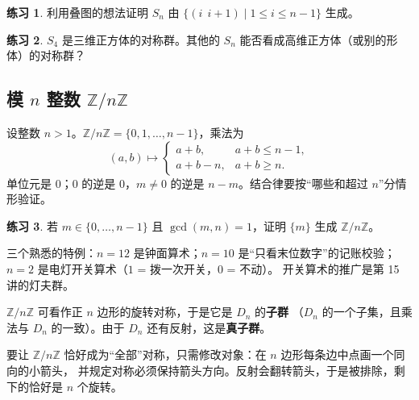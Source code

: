 \documentclass[11pt,a4paper]{article}
\theoremstyle{definition}
\newtheorem{exercise}{练习}
\theoremstyle{plain}
\theoremstyle{remark}
\newcommand{\Z}{\mathbb{Z}}
\begin{document}
\begin{exercise}
利用叠图的想法证明 $S_n$ 由 $\{(i\;\,i{+}1)\mid 1\le i\le n-1\}$ 生成。
\end{exercise}
\begin{exercise}
$S_4$ 是三维正方体的对称群。其他的 $S_n$ 能否看成高维正方体（或别的形体）的对称群？
\end{exercise}

\subsection{模 $n$ 整数 $\Z/n\Z$}

设整数 $n>1$。$\Z/n\Z=\{0,1,\dots,n-1\}$，乘法为
\[
  (a,b)\mapsto
  \begin{cases}
    a+b, & a+b\le n-1,\\
    a+b-n, & a+b\ge n.
  \end{cases}
\]
单位元是 $0$；$0$ 的逆是 $0$，$m\neq0$ 的逆是 $n-m$。结合律要按“哪些和超过 $n$”分情形验证。

\begin{exercise}
若 $m\in\{0,\dots,n-1\}$ 且 $\gcd(m,n)=1$，证明 $\{m\}$ 生成 $\Z/n\Z$。
\end{exercise}

三个熟悉的特例：$n=12$ 是钟面算术；$n=10$ 是“只看末位数字”的记账校验；$n=2$ 是电灯开关算术（$1$ = 拨一次开关，$0$ = 不动）。
开关算术的推广是第 15 讲的灯夫群。

\begin{keyidea}[$\Z/n\Z$ 是什么东西的对称群？]
$\Z/n\Z$ 可看作正 $n$ 边形的旋转对称，于是它是 $D_n$ 的\textbf{子群}
（$D_n$ 的一个子集，且乘法与 $D_n$ 的一致）。由于 $D_n$ 还有反射，这是\textbf{真子群}。

要让 $\Z/n\Z$ 恰好成为“全部”对称，只需修改对象：在 $n$ 边形每条边中点画一个同向的小箭头，
并规定对称必须保持箭头方向。反射会翻转箭头，于是被排除，剩下的恰好是 $n$ 个旋转。
\begin{center}
\end{center}
\end{keyidea}
\end{document}
